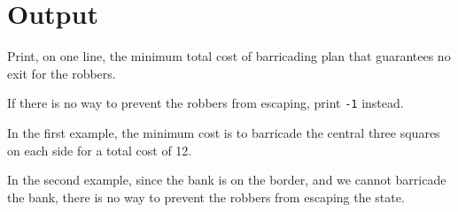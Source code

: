 \documentclass{article}
\begin{document}
\section{Output}

Print, on one line, the minimum total cost of barricading plan that
guarantees no exit for the robbers.

If there is no way to prevent the robbers from escaping,
print \texttt{-1} instead.

In the first example,
the minimum cost is to barricade the central three squares on each
side for a total cost of 12.

In the second example,
since the bank is on the border, and we cannot barricade the bank,
there is no way to prevent the robbers from escaping the state.

\end{document}

